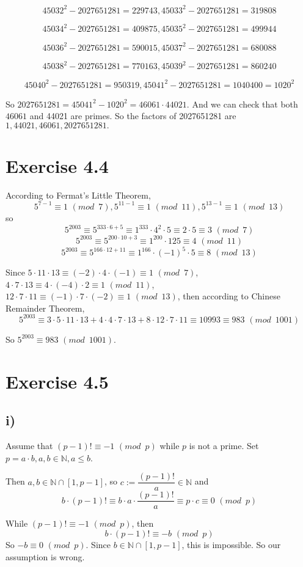 \documentclass[a4paper,12pt,titlepage]{article}
\begin{document}
$$45032^2-2027651281=229743,
45033^2-2027651281=319808$$ 

$$45034^2-2027651281=409875,
45035^2-2027651281=499944$$

$$45036^2-2027651281=590015,
45037^2-2027651281=680088$$

$$45038^2-2027651281=770163,
45039^2-2027651281=860240$$

$$45040^2-2027651281=950319,
45041^2-2027651281=1040400=1020^2$$   

So $2027651281=45041^2-1020^2=46061\cdot44021$. And we can check that both $46061$ and 44021 are primes. So the factors of 2027651281 are $1,44021,46061,2027651281.$
 
 
 \section*{Exercise 4.4}
According to Fermat's Little Theorem, 
$$5^{7-1}\equiv1\,\,(mod\,\,\,7),5^{11-1}\equiv1\,\,(mod\,\,\,11),5^{13-1}\equiv1\,\,(mod\,\,\,13)$$ 
so
$$5^{2003}\equiv5^{333\cdot6+5}\equiv1^{333}\cdot4^2\cdot5\equiv2\cdot5\equiv3\,\,(mod\,\,\,7)$$ 
$$5^{2003}\equiv5^{200\cdot10+3}\equiv1^{200}\cdot125\equiv4\,\,(mod\,\,\,11)$$  
$$5^{2003}\equiv5^{166\cdot12+11}\equiv1^{166}\cdot(-1)^5\cdot5\equiv8\,\,(mod\,\,\,13)$$  
 
Since $5\cdot11\cdot13\equiv(-2)\cdot4\cdot(-1)\equiv1\,\,(mod\,\,\,7)$, $4\cdot7\cdot13\equiv4\cdot(-4)\cdot2\equiv1\,\,(mod\,\,\,11)$,
$12\cdot7\cdot11\equiv(-1)\cdot7\cdot(-2)\equiv1\,\,(mod\,\,\,13)$, then according to Chinese Remainder Theorem,
$$5^{2003}\equiv3\cdot5\cdot11\cdot13+
4\cdot4\cdot7\cdot13+8\cdot12\cdot7\cdot11
\equiv10993\equiv983\,\,(mod\,\,\,1001)$$   

So $5^{2003}\equiv 983\,\,(mod\,\,\,1001)$. 
\section*{Exercise 4.5} 
\subsection*{i)} 
Assume that $(p-1)!\equiv-1\,\,(mod\,\,\,p)$ while $p$ is not a prime. Set $p=a\cdot b, a,b\in\mathbb{N},a\leqslant b$.
 
Then $a,b\in\mathbb{N}\cap[1,p-1]$, so $c:=\dfrac{(p-1)!}{a}\in\mathbb{N}$ and 
$$b\cdot(p-1)!\equiv b\cdot a\cdot \dfrac{(p-1)!}{a}\equiv p\cdot c\equiv0\,\,(mod\,\,\,p)$$

While $(p-1)!\equiv-1\,\,(mod\,\,\,p)$, then
$$b\cdot (p-1)!\equiv -b \,\,(mod\,\,\,p)$$
So $-b\equiv0\,\,(mod\,\,\,p)$. Since $b\in\mathbb{N}\cap[1,p-1]$, this is impossible. So our assumption is wrong.
\end{document}
